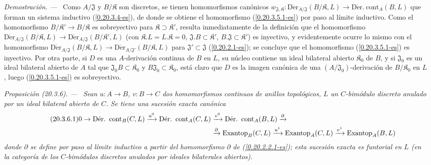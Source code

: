 \documentclass[10pt,oneside]{book}
\makeatletter
\newcommand{\sref}[1]{\textup{(\ref{#1})}}
\newcommand{\setmanualcurrentlabel}[1]{\def\@currentlabel{#1}}
\newcommand{\oldpage}[2][]{%
  \setcounter{footnote}{0}%
  \marginpar{\scriptsize\textbf{#1}~|~#2}\ignorespaces}
\newenvironment{proposition}[1][]{%
  \setmanualcurrentlabel{#1}\par\medskip\noindent\itshape Proposición (#1). ---\ }{\par}
\newenvironment{proof}{%
  \par\medskip\noindent\textit{Demostración. ---\ }}{\par}
\makeatother
\begin{document}
\begin{proof}
Como $A/\mathfrak{J}$ y $B/\mathfrak K$ son discretos, se tienen
homomorfismos canónicos
$w_{\mathfrak{J},\mathfrak K}:
\operatorname{D\acute{e}r}_{A/\mathfrak{J}}(B/\mathfrak K,L)\to
\operatorname{D\acute{e}r.\ cont}_A(B,L)$ que forman un sistema inductivo
\sref{0.20.3.4-es}, de donde se obtiene el homomorfismo \sref{0.20.3.5.1-es} por paso al
límite inductivo. Como el homomorfismo
$B/\mathfrak K'\to B/\mathfrak K$ es sobreyectivo para
$\mathfrak K\supset\mathfrak K'$, resulta inmediatamente de la definición que
el homomorfismo
$\operatorname{D\acute{e}r}_{A/\mathfrak{J}}(B/\mathfrak K,L)\to
\operatorname{D\acute{e}r}_{A/\mathfrak{J}}(B/\mathfrak K',L)$ (con
$\mathfrak K.L=L.\mathfrak K=0$,
$\mathfrak{J}.B\subset\mathfrak K'$,
$B.\mathfrak{J}\subset\mathfrak K'$) es inyectivo, y evidentemente ocurre
lo mismo con el homomorfismo
$\operatorname{D\acute{e}r}_{A/\mathfrak{J}}(B/\mathfrak K,L)\to
\operatorname{D\acute{e}r}_{A/\mathfrak{J}'}(B/\mathfrak K,L)$ para
$\mathfrak{J}'\subset\mathfrak{J}$ \sref{0.20.2.1-es}; se concluye que
el homomorfismo \sref{0.20.3.5.1-es} es inyectivo. Por otra parte, si $D$ es
una $A$-derivación continua de $B$ en $L$, su núcleo contiene un ideal
bilateral abierto $\mathfrak K_0$ de $B$, y si $\mathfrak{J}_0$ es un ideal
bilateral abierto de $A$ tal que $\mathfrak{J}_0B\subset\mathfrak K_0$ y
$B\mathfrak{J}_0\subset\mathfrak K_0$, está claro que $D$ es la imagen
canónica de una $(A/\mathfrak{J}_0)$-derivación de
$B/\mathfrak K_0$ en $L$, luego \sref{0.20.3.5.1-es} es sobreyectivo.
\end{proof}

\oldpage[0\textsubscript{IV-1}]{123}
\begin{proposition}[20.3.6]
\label{0.20.3.6-es}
Sean $u:A\to B$, $v:B\to C$ dos homomorfismos continuos de anillos
topológicos, $L$ un $C$-bimódulo discreto anulado por un ideal bilateral abierto
de $C$. Se tiene una sucesión exacta canónica
\begin{align}
\tag{20.3.6.1}
\label{0.20.3.6.1-es}
  0\to\operatorname{D\acute{e}r.\ cont}_B(C,L)\xrightarrow{u^0}
  \operatorname{D\acute{e}r.\ cont}_A(C,L)&\xrightarrow{v^0}
  \operatorname{D\acute{e}r.\ cont}_A(B,L)\xrightarrow{\partial} \\
  &\xrightarrow{\partial}\operatorname{Exantop}_B(C,L)\xrightarrow{u^1}
  \operatorname{Exantop}_A(C,L)\xrightarrow{v^1}
  \operatorname{Exantop}_A(B,L) \notag
\end{align}
donde $\partial$ se define por paso al límite inductivo a partir del
homomorfismo $\partial$ de \sref{0.20.2.2.1-es}; esta sucesión exacta es
funtorial en $L$ (en la categoría de los $C$-bimódulos discretos anulados por
ideales bilaterales abiertos).
\end{proposition}
\end{document}
